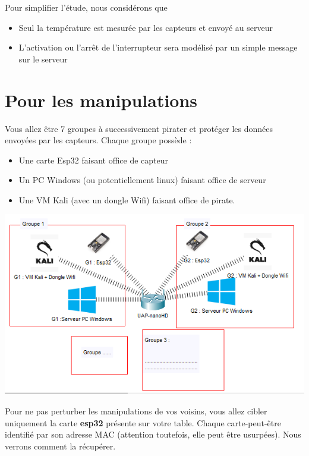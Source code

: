 \documentclass[french, 12pt]{article}%
\newcommand{\itemE}{\item[$\bullet$]}
\begin{document}
Pour simplifier l'étude, nous considérons que 
\begin{itemize}
\itemE Seul la température est mesurée par les capteurs et envoyé au serveur
\itemE L'activation ou l'arrêt de l'interrupteur sera modélisé par un simple message sur le serveur
\end{itemize}

\section{Pour les manipulations}
Vous allez être 7 groupes à successivement pirater et protéger les données envoyées par les capteurs. Chaque groupe possède : 
\begin{itemize}
\itemE Une carte Esp32 faisant office de capteur
\itemE Un PC Windows (ou potentiellement linux) faisant office de serveur
\itemE Une VM Kali (avec un dongle Wifi) faisant office de pirate. 
\end{itemize}

\begin{center}
\includegraphics[scale=0.7]{./ressource/topologieActivite}
\end{center}


Pour ne pas perturber les manipulations de vos voisins, vous allez cibler uniquement la carte \textbf{esp32} présente sur votre table.  Chaque carte-peut-être identifié par son adresse MAC (attention toutefois, elle peut être usurpées). Nous verrons comment la récupérer.
\end{document}
